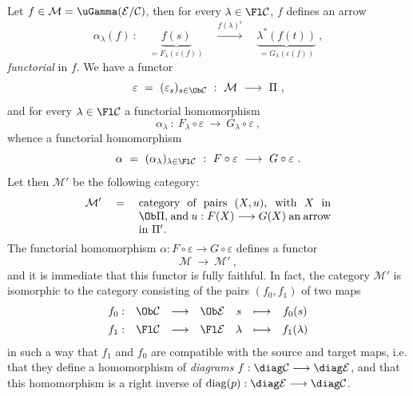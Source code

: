 Let $f \in \mathcal{M} = \uGamma(\mathcal{E}/\mathcal{C})$, then for every $\lambda \in \Fl\mathcal{C}$, $f$ defines an arrow
\[
\alpha_\lambda(f) \ : \quad \underbrace{f(s)}_{= F_\lambda(\varepsilon(f))} \quad \xrightarrow{f(\lambda)^\flat} \quad \underbrace{\lambda^*(f(t))}_{= G_\lambda(\varepsilon(f))} \ ,
\]
\textit{functorial} in $f$. We have a functor
\[
\varepsilon \ = \ (\varepsilon_s)_{s\in\Ob\mathcal{C}} \ : \ \mathcal{M} \ \longrightarrow \ \Pi \ ,
\]
and for every $\lambda \in \Fl\mathcal{C}$ a functorial homomorphism
\[
\alpha_\lambda \ : \ F_\lambda \circ \varepsilon \ \longrightarrow \ G_\lambda \circ \varepsilon \ ,
\]
whence a functorial homomorphism
\[
\alpha \ = \ (\alpha_\lambda)_{\lambda\in\Fl\mathcal{C}} \ : \ F \circ \varepsilon \ \longrightarrow \ G \circ \varepsilon \ .
\]
Let then $\mathcal{M}'$ be the following category:
\[
\mathcal{M}' \quad = \quad \parbox[t]{0.5\textwidth}{category of pairs $(X,u)$, with $X$ in $\Ob\Pi$, and $u : F(X) \longrightarrow G(X)$ an arrow in $\Pi'$.}
\]
The functorial homomorphism $\alpha : F \circ \varepsilon \longrightarrow G \circ \varepsilon$ defines a functor
\[
\mathcal{M} \ \longrightarrow \ \mathcal{M}' \ ,
\]
and it is immediate that this functor is fully faithful. In fact, the category $\mathcal{M}'$ is isomorphic to the category consisting of the pairs $(f_0,f_1)$ of two maps
\[
\begin{array}{lcccccc}
f_0 : & \Ob\mathcal{C} & \longrightarrow & \Ob\mathcal{E} & s & \longmapsto & f_0(s)\\[1ex]
f_1 : & \Fl\mathcal{C} & \longrightarrow & \Fl\mathcal{E} & \lambda & \longmapsto & f_1(\lambda)
\end{array}
\]
in such a way that $f_1$ and $f_0$ are compatible with the source and target maps, i.e. that they define a homomorphism of \textit{diagrams} $f : \diag\mathcal{C} \longrightarrow \diag\mathcal{E}$, and that this homomorphism is a right inverse of $\mathrm{diag}(p) : \diag\mathcal{E} \longrightarrow \diag\mathcal{C}$.

